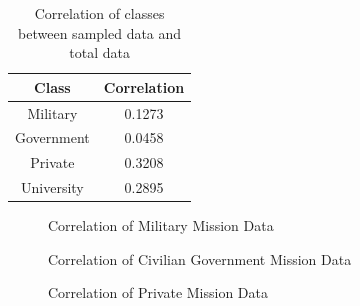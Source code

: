 \documentclass[11pt]{article}
\begin{document}
\begin{table}[h]
\centering
\caption{Correlation of classes between sampled data and total data}
\label{correlation}
\begin{tabular}{|c|c|}
\hline
\textbf{Class} & \textbf{Correlation} \\ \hline
Military & 0.1273 \\ \hline
Government & 0.0458 \\ \hline
Private & 0.3208 \\ \hline
University & 0.2895 \\ \hline
\end{tabular}
\end{table}

\begin{figure}[ht!]
\centering
{}
\caption{Correlation of Military Mission Data}
\label{military}
\end{figure}

\begin{figure}[ht!]
\centering
{}
\caption{Correlation of Civilian Government Mission Data}
\label{gov}
\end{figure}

\begin{figure}[ht!]
\centering
{}
\caption{Correlation of Private Mission Data}
\label{private}
\end{figure}
\end{document}
